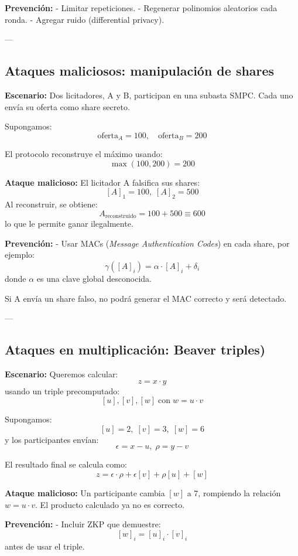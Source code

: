 \documentclass{article}
\begin{document}
\textbf{Prevención:}  
- Limitar repeticiones.  
- Regenerar polinomios aleatorios cada ronda.  
- Agregar ruido (differential privacy).

---

\subsection{Ataques maliciosos: manipulación de shares}

\textbf{Escenario:} Dos licitadores, A y B, participan en una subasta SMPC. Cada uno envía su oferta como share secreto.

Supongamos:
\[
\text{oferta}_A = 100, \quad \text{oferta}_B = 200
\]

El protocolo reconstruye el máximo usando:
\[
\max(100, 200) = 200
\]

\textbf{Ataque malicioso:} El licitador A falsifica sus shares:
\[
[A]_1 = 100, \; [A]_2 = 500
\]
Al reconstruir, se obtiene:
\[
A_{\text{reconstruido}} = 100 + 500 \equiv 600
\]
lo que le permite ganar ilegalmente.

\textbf{Prevención:}  
- Usar MACs (\textit{Message Authentication Codes}) en cada share, por ejemplo:
\[
\gamma([A]_i) = \alpha \cdot [A]_i + \delta_i
\]
donde \( \alpha \) es una clave global desconocida.

Si A envía un share falso, no podrá generar el MAC correcto y será detectado.

---

\subsection{Ataques en multiplicación: Beaver triples)}

\textbf{Escenario:} Queremos calcular:
\[
z = x \cdot y
\]
usando un triple precomputado:
\[
[u], [v], [w] \; \text{con} \; w = u \cdot v
\]

Supongamos:
\[
[u] = 2, \; [v] = 3, \; [w] = 6
\]
y los participantes envían:
\[
\epsilon = x - u, \; \rho = y - v
\]

El resultado final se calcula como:
\[
z = \epsilon \cdot \rho + \epsilon [v] + \rho [u] + [w]
\]

\textbf{Ataque malicioso:} Un participante cambia \( [w] \) a 7, rompiendo la relación \( w = u \cdot v \). El producto calculado ya no es correcto.

\textbf{Prevención:}  
- Incluir ZKP que demuestre:
\[
[w]_i = [u]_i \cdot [v]_i
\]
antes de usar el triple.
\end{document}
